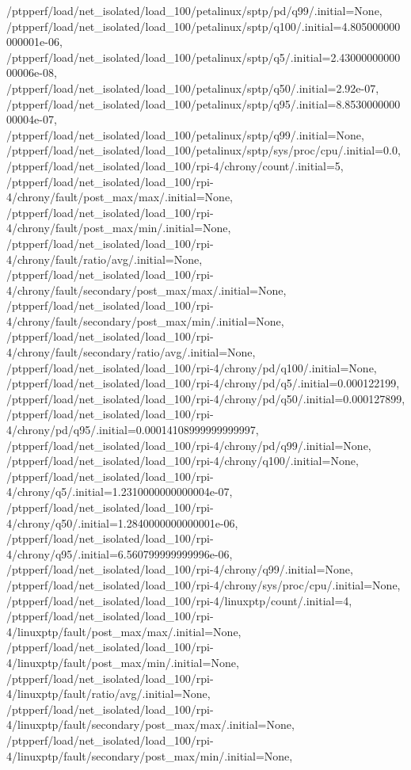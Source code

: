 {    /ptpperf/load/net_isolated/load_100/petalinux/sptp/pd/q99/.initial=None,
    /ptpperf/load/net_isolated/load_100/petalinux/sptp/q100/.initial=4.805000000000001e-06,
    /ptpperf/load/net_isolated/load_100/petalinux/sptp/q5/.initial=2.4300000000000006e-08,
    /ptpperf/load/net_isolated/load_100/petalinux/sptp/q50/.initial=2.92e-07,
    /ptpperf/load/net_isolated/load_100/petalinux/sptp/q95/.initial=8.853000000000004e-07,
    /ptpperf/load/net_isolated/load_100/petalinux/sptp/q99/.initial=None,
    /ptpperf/load/net_isolated/load_100/petalinux/sptp/sys/proc/cpu/.initial=0.0,
    /ptpperf/load/net_isolated/load_100/rpi-4/chrony/count/.initial=5,
    /ptpperf/load/net_isolated/load_100/rpi-4/chrony/fault/post_max/max/.initial=None,
    /ptpperf/load/net_isolated/load_100/rpi-4/chrony/fault/post_max/min/.initial=None,
    /ptpperf/load/net_isolated/load_100/rpi-4/chrony/fault/ratio/avg/.initial=None,
    /ptpperf/load/net_isolated/load_100/rpi-4/chrony/fault/secondary/post_max/max/.initial=None,
    /ptpperf/load/net_isolated/load_100/rpi-4/chrony/fault/secondary/post_max/min/.initial=None,
    /ptpperf/load/net_isolated/load_100/rpi-4/chrony/fault/secondary/ratio/avg/.initial=None,
    /ptpperf/load/net_isolated/load_100/rpi-4/chrony/pd/q100/.initial=None,
    /ptpperf/load/net_isolated/load_100/rpi-4/chrony/pd/q5/.initial=0.000122199,
    /ptpperf/load/net_isolated/load_100/rpi-4/chrony/pd/q50/.initial=0.000127899,
    /ptpperf/load/net_isolated/load_100/rpi-4/chrony/pd/q95/.initial=0.00014108999999999997,
    /ptpperf/load/net_isolated/load_100/rpi-4/chrony/pd/q99/.initial=None,
    /ptpperf/load/net_isolated/load_100/rpi-4/chrony/q100/.initial=None,
    /ptpperf/load/net_isolated/load_100/rpi-4/chrony/q5/.initial=1.2310000000000004e-07,
    /ptpperf/load/net_isolated/load_100/rpi-4/chrony/q50/.initial=1.2840000000000001e-06,
    /ptpperf/load/net_isolated/load_100/rpi-4/chrony/q95/.initial=6.560799999999996e-06,
    /ptpperf/load/net_isolated/load_100/rpi-4/chrony/q99/.initial=None,
    /ptpperf/load/net_isolated/load_100/rpi-4/chrony/sys/proc/cpu/.initial=None,
    /ptpperf/load/net_isolated/load_100/rpi-4/linuxptp/count/.initial=4,
    /ptpperf/load/net_isolated/load_100/rpi-4/linuxptp/fault/post_max/max/.initial=None,
    /ptpperf/load/net_isolated/load_100/rpi-4/linuxptp/fault/post_max/min/.initial=None,
    /ptpperf/load/net_isolated/load_100/rpi-4/linuxptp/fault/ratio/avg/.initial=None,
    /ptpperf/load/net_isolated/load_100/rpi-4/linuxptp/fault/secondary/post_max/max/.initial=None,
    /ptpperf/load/net_isolated/load_100/rpi-4/linuxptp/fault/secondary/post_max/min/.initial=None,
}
